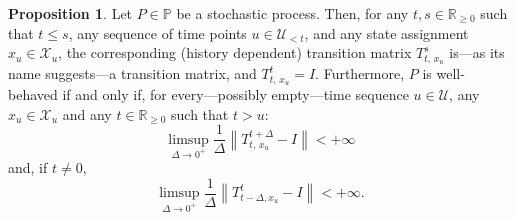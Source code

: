 \documentclass[10pt,a4paper]{paper}
\theoremstyle{definition}
\newtheorem{proposition}[theorem]{Proposition}
\newcommand{\reals}{\mathbb{R}}
\newcommand{\realspos}{\reals_{>0}}
\newcommand{\realsnonneg}{\reals_{\geq 0}}
\newcommand{\states}{\mathcal{X}}
\newcommand{\processes}{\mathbb{P}}
\newcommand{\norm}[1]{\left\lVert #1 \right\rVert}
\begin{document}
\begin{proposition}\label{prop:stochasticprocess:simpleproperties}
Let $P\in\processes$ be a stochastic process.  %
Then, for any $t,s\in\realsnonneg$ such that $t\leq s$, any sequence of time points $u\in\mathcal{U}_{<t}$, and any state assignment $x_u\in\states_u$, the corresponding (history dependent) transition matrix $T_{t,\,x_u}^s$ is---as its name suggests---a transition matrix, and $T_{t,\,x_u}^t=I$. Furthermore, $P$ is well-behaved if and only if, for every---possibly empty---time sequence $u\in\mathcal{U}$, any $x_u\in\states_u$ and any $t\in\reals_{\geq0}$ such that $t>u$:
\begin{equation}\label{eq:def:well-behaved:right:matrix}
\limsup_{\Delta\to 0^{+}}\frac{1}{\Delta}\norm{T_{t,\,x_u}^{t+\Delta}-I}<+\infty
\end{equation}
and, if $t\neq0$,
\begin{equation}\label{eq:def:well-behaved:left:matrix}
\limsup_{\Delta\to 0^{+}}\frac{1}{\Delta}\norm{T_{t-\Delta,x_u}^{t}-I}<+\infty.
\end{equation}
\vspace{-4pt}
\end{proposition}
\end{document}

